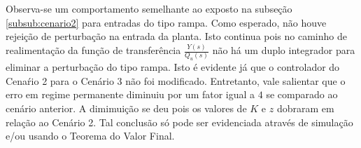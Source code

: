 Observa-se um comportamento semelhante ao exposto na subseção
\ref{subsub:cenario2} para entradas do tipo rampa. Como esperado, não houve
rejeição de perturbação na entrada da planta. Isto continua pois no caminho de
realimentação da função de transferência $\frac{Y(s)}{Q_{u}(s)}$ não há um
duplo integrador para eliminar a perturbação do tipo rampa. Isto é evidente já
que o controlador do Cenaŕio 2 para o Cenário 3 não foi modificado. Entretanto,
vale salientar que o erro em regime permanente diminuiu por um fator igual a
$4$ se comparado ao cenário anterior. A dimimuição se deu pois os valores de $K$
e $z$ dobraram em relação ao Cenário 2. Tal conclusão só pode ser evidenciada
através de simulação e/ou usando o Teorema do Valor Final.
